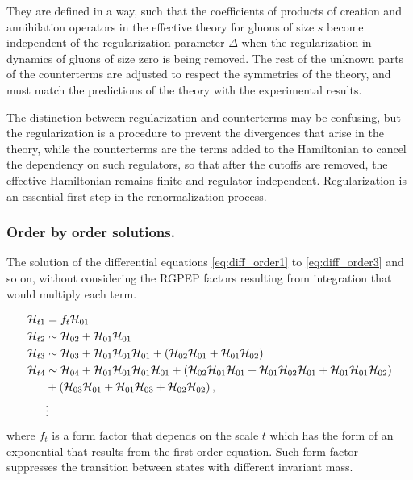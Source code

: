 \documentclass[11pt,a4paper,twoside,pdf]{article}
\numberwithin{equation}{section}
\begin{document}
They are defined in a way, such that the coefficients of products 
of creation and annihilation operators in the effective theory for gluons of size $s$
become independent of the regularization parameter $\Delta$ when the regularization
in dynamics of gluons of size zero is being removed. The rest of the unknown parts 
of the counterterms are adjusted to respect the symmetries of the theory, and must 
match the predictions of the theory with the experimental results.

The distinction between regularization and counterterms may be confusing, but the
regularization is a procedure to prevent the divergences that arise
in the theory, while the counterterms are the terms added to the Hamiltonian to 
cancel the dependency on such regulators, so that after the cutoffs are removed, the 
effective Hamiltonian remains finite and regulator independent. Regularization is
an essential first step in the renormalization process.

\subsubsection{Order by order solutions.} \label{sec:orderbyorder_solutions}

The solution of the differential equations \eqref{eq:diff_order1} to \eqref{eq:diff_order3} 
and so on, without considering the RGPEP factors resulting from integration that would multiply each term.

\begin{align}
    \mathcal{H}_{t1} & = f_{t} \mathcal{H}_{01} \\
    \mathcal{H}_{t2} & \sim \mathcal{H}_{02} + \mathcal{H}_{01} 
    \mathcal{H}_{01}\\
    \mathcal{H}_{t3} & \sim \mathcal{H}_{03} + \mathcal{H}_{01} \mathcal{H}_{01}
    \mathcal{H}_{01} + \left( \mathcal{H}_{02} \mathcal{H}_{01} + 
    \mathcal{H}_{01} \mathcal{H}_{02} \right)\\
    \mathcal{H}_{t4} & \sim \mathcal{H}_{04} + \mathcal{H}_{01} \mathcal{H}_{01}
    \mathcal{H}_{01} \mathcal{H}_{01} + \left( \mathcal{H}_{02} 
    \mathcal{H}_{01} \mathcal{H}_{01} +  \mathcal{H}_{01} \mathcal{H}_{02}
    \mathcal{H}_{01} + \mathcal{H}_{01} \mathcal{H}_{01} \mathcal{H}_{02} \right) \nonumber\\
    & + \left( \mathcal{H}_{03} \mathcal{H}_{01} + \mathcal{H}_{01} 
    \mathcal{H}_{03} + \mathcal{H}_{02}\mathcal{H}_{02} \right),\\
    &\vdots  \nonumber
\end{align}
where $f_{t}$ is a form factor that depends on the scale $t$ which has the form
of an exponential that
results from the first-order equation.
Such form factor suppresses the transition between states with 
different invariant mass.
\end{document}
